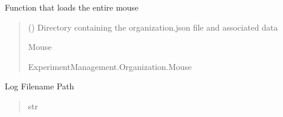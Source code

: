 \documentclass[letterpaper,10pt,english]{sphinxmanual}
\begin{document}
\begin{fulllineitems}
\begin{fulllineitems}
\begin{quote}
\begin{description}
\end{description}\end{quote}

\end{fulllineitems}


\begin{fulllineitems}
\label{\detokenize{Organization:Organization.Mouse.load}}
\pysigstartsignatures
{}
\pysigstopsignatures
\sphinxAtStartPar
Function that loads the entire mouse
\begin{quote}\begin{description}
\sphinxAtStartPar
{} (\sphinxstyleliteralemphasis{\sphinxupquote{{[}}}\sphinxstyleliteralemphasis{\sphinxupquote{{]}}}) \textendash{} Directory containing the organization.json file and associated data

\sphinxAtStartPar
Mouse

\sphinxAtStartPar
ExperimentManagement.Organization.Mouse

\end{description}\end{quote}

\end{fulllineitems}


\begin{fulllineitems}
\label{\detokenize{Organization:Organization.Mouse.log_file}}
\pysigstartsignatures
{}
\pysigstopsignatures
\sphinxAtStartPar
Log Filename Path
\begin{quote}\begin{description}
\sphinxAtStartPar
str


\end{description}
\end{quote}
\end{fulllineitems}
\end{fulllineitems}
\end{document}
